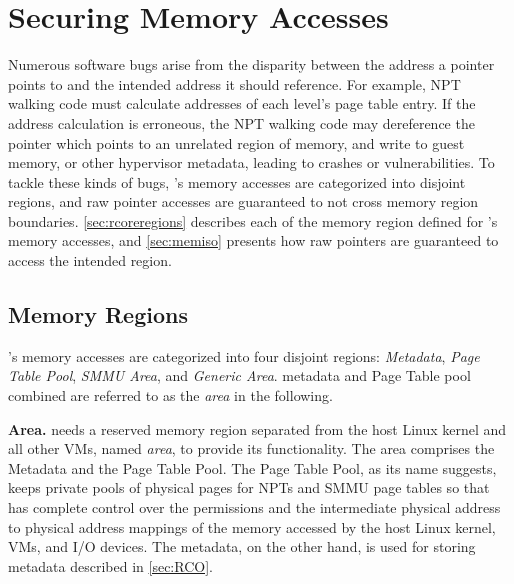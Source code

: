 \chapter{Securing \rustcore{} Memory Accesses}
\label{sec:securercore}

%

%
Numerous software bugs arise from the disparity between the address a pointer
points to and the intended address it should reference.
For example, NPT walking code must calculate addresses of each level's page
table entry. If the address calculation is erroneous, the NPT walking code may
dereference the pointer which points to an unrelated region of memory, and
write to guest memory, or other hypervisor metadata, leading to crashes or
vulnerabilities.
To tackle these kinds of bugs, \rustcore{}'s memory accesses are categorized
into disjoint regions, and raw pointer accesses are guaranteed to not cross
memory region boundaries. \autoref{sec:rcoreregions} describes each of the
memory region defined for \rustcore{}'s memory accesses, and
\autoref{sec:memiso} presents how raw pointers are guaranteed to access the
intended region.

\section{\rustcore{} Memory Regions}
\label{sec:rcoreregions}

\rustcore{}'s memory accesses are categorized into four disjoint regions:
\textit{\rustcore{} Metadata}, \textit{Page Table Pool},
\textit{SMMU Area}, and \textit{Generic Area}.
\rustcore{} metadata and \rustcore{} Page Table pool combined are referred to as
the \textit{\rustcore{} area} in the following.

\textbf{\rustcore{} Area.}
\rustcore{} needs a reserved memory region separated from the host Linux kernel
and all other VMs, named \textit{\rustcore{} area}, to provide its functionality.
The \rustcore{} area comprises the \rustcore{} Metadata and the \rustcore{} Page Table Pool.
The \rustcore{} Page Table Pool, as its name suggests, keeps private pools of physical pages
for NPTs and SMMU page tables so that \rustcore{} has complete control
over the permissions and the intermediate physical address to physical address mappings of the memory
accessed by the host Linux kernel, VMs, and I/O devices. The \rustcore{} metadata,
on the other hand, is used for storing \rustcore{} metadata described in
\autoref{sec:RCO}.

